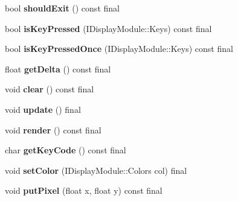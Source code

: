 \begin{DoxyCompactItemize}
\mbox{\label{classArcade_1_1Display_1_1SFML_a780a71713551c8dffd1f008802f96767}} 
bool {\bfseries should\+Exit} () const final
\item 
\mbox{\label{classArcade_1_1Display_1_1SFML_a760b5a751030b18d6c92eed5640f2c76}} 
bool {\bfseries is\+Key\+Pressed} (I\+Display\+Module\+::\+Keys) const final
\item 
\mbox{\label{classArcade_1_1Display_1_1SFML_a499cc23f5567f0d9f8a9ba71cf30add9}} 
bool {\bfseries is\+Key\+Pressed\+Once} (I\+Display\+Module\+::\+Keys) const final
\item 
\mbox{\label{classArcade_1_1Display_1_1SFML_ae1466db8c13b08e99ebe5ffab68884c7}} 
float {\bfseries get\+Delta} () const final
\item 
\mbox{\label{classArcade_1_1Display_1_1SFML_a30b939c69d4cbdc05aa19ec103bbcb51}} 
void {\bfseries clear} () const final
\item 
\mbox{\label{classArcade_1_1Display_1_1SFML_a83c844ab1f8e93deca5cf59c27d984ef}} 
void {\bfseries update} () final
\item 
\mbox{\label{classArcade_1_1Display_1_1SFML_a23af1507649a0a5492241646ef0fbaac}} 
void {\bfseries render} () const final
\item 
\mbox{\label{classArcade_1_1Display_1_1SFML_ae2bf9e9c157a9f0ae8d1b60bd072e881}} 
char {\bfseries get\+Key\+Code} () const final
\item 
\mbox{\label{classArcade_1_1Display_1_1SFML_a20555c4dd9cf956c5ffae5acab8e79b2}} 
void {\bfseries set\+Color} (I\+Display\+Module\+::\+Colors col) final
\item 
\mbox{\label{classArcade_1_1Display_1_1SFML_a68417ef6b0450c6c7e6fa022699a2c3b}} 
void {\bfseries put\+Pixel} (float x, float y) const final
\item 
\mbox{\label{classArcade_1_1Display_1_1SFML_a7e6da03013c96af1362b584282d9ba01}} 

\end{DoxyCompactItemize}
